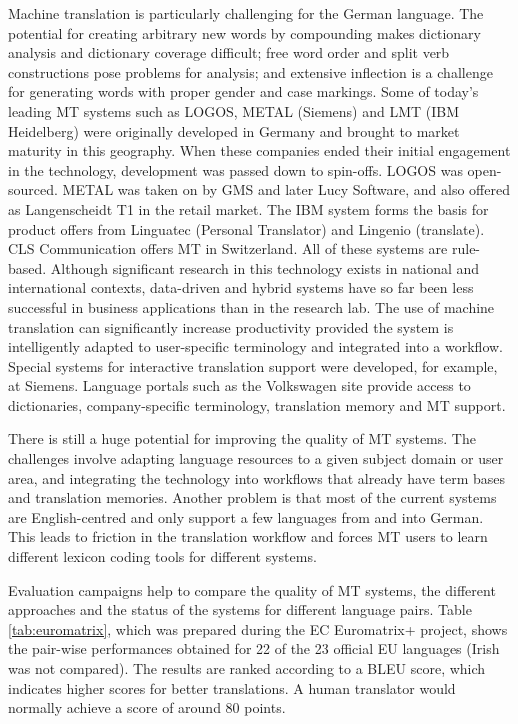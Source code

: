 \documentclass[]{../../metanetpaper}
\begin{document}
\begin{Parallel}[c]{79mm}{78mm}
{Machine translation is particularly challenging for the German language. The potential for creating arbitrary new words by compounding makes dictionary analysis and 
dictionary coverage difficult; free word order and split verb constructions pose problems for analysis; and extensive inflection is a 
challenge for generating words with proper gender and case markings. 
Some of today's leading MT systems such as LOGOS, METAL (Siemens) and LMT (IBM Heidelberg) were originally developed in Germany and brought to 
market maturity in this geography. When these companies ended their initial engagement in the technology, development was passed down 
to spin-offs. LOGOS was open-sourced. METAL was taken on by GMS and later Lucy Software, and also offered as Langenscheidt T1 in the 
retail market. The IBM system forms the basis for product offers from Linguatec (Personal Translator) and Lingenio (translate). CLS 
Communication offers MT in Switzerland. All of these systems are rule-based. Although significant research in this technology exists 
in national and international contexts, data-driven and hybrid systems have so far been less successful in business applications than 
in the research lab. 
The use of machine translation can significantly increase productivity provided the system is intelligently adapted to user-specific 
terminology and integrated into a workflow. Special systems for interactive translation support were developed, for example, at 
Siemens. Language portals such as the Volkswagen site provide access to dictionaries, company-specific terminology, translation memory 
and MT support. 

There is still a huge potential for improving the quality of MT systems. The challenges involve adapting language resources to a given subject domain or user area, and integrating the technology into workflows that already have term bases and translation memories. Another problem is that most of the current systems are English-centred and only support a few languages from and into German. This leads to friction in the translation workflow and forces MT users to learn different lexicon coding tools for different systems.

Evaluation campaigns help to compare the quality of MT systems, the different approaches and the status of the systems for different language pairs. Table \ref{tab:euromatrix}, which was prepared during the EC Euromatrix+ project, shows the pair-wise performances obtained for 22 of the 23 official EU languages (Irish was not compared). The results are ranked according to a BLEU score, which indicates higher scores for better translations\cite{bleu1}. A human translator would normally achieve a score of around 80 points.

}
\end{Parallel}
\end{document}

